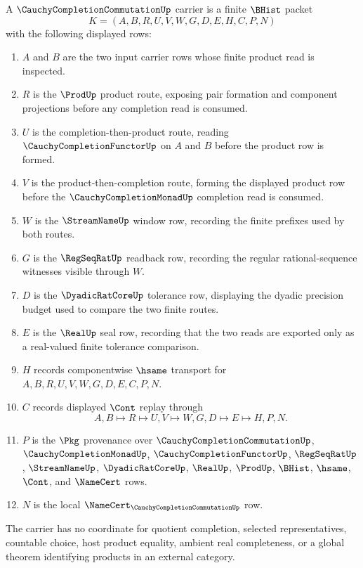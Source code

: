 \begin{definition}
\label{def:cauchy-completion-commutation-carrier}
A $\CauchyCompletionCommutationUp$ carrier is a finite $\BHist$ packet
$$
K=(A,B,R,U,V,W,G,D,E,H,C,P,N)
$$
with the following displayed rows:
\begin{enumerate}
\item $A$ and $B$ are the two input carrier rows whose finite product read is inspected.
\item $R$ is the $\ProdUp$ product route, exposing pair formation and component projections before any completion read is consumed.
\item $U$ is the completion-then-product route, reading $\CauchyCompletionFunctorUp$ on $A$ and $B$ before the product row is formed.
\item $V$ is the product-then-completion route, forming the displayed product row before the $\CauchyCompletionMonadUp$ completion read is consumed.
\item $W$ is the $\StreamNameUp$ window row, recording the finite prefixes used by both routes.
\item $G$ is the $\RegSeqRatUp$ readback row, recording the regular rational-sequence witnesses visible through $W$.
\item $D$ is the $\DyadicRatCoreUp$ tolerance row, displaying the dyadic precision budget used to compare the two finite routes.
\item $E$ is the $\RealUp$ seal row, recording that the two reads are exported only as a real-valued finite tolerance comparison.
\item $H$ records componentwise $\hsame$ transport for $A,B,R,U,V,W,G,D,E,C,P,N$.
\item $C$ records displayed $\Cont$ replay through
$$
A,B \longmapsto R \longmapsto U,V \longmapsto W,G,D \longmapsto E \longmapsto H,P,N .
$$
\item $P$ is the $\Pkg$ provenance over $\CauchyCompletionCommutationUp$, $\CauchyCompletionMonadUp$, $\CauchyCompletionFunctorUp$, $\RegSeqRatUp$, $\StreamNameUp$, $\DyadicRatCoreUp$, $\RealUp$, $\ProdUp$, $\BHist$, $\hsame$, $\Cont$, and $\NameCert$ rows.
\item $N$ is the local $\NameCert_{\CauchyCompletionCommutationUp}$ row.
\end{enumerate}
The carrier has no coordinate for quotient completion, selected representatives, countable choice, host product equality, ambient real completeness, or a global theorem identifying products in an external category.
\end{definition}

